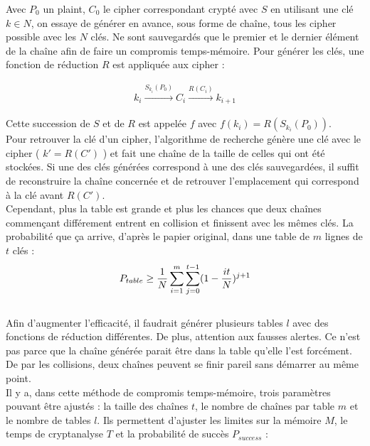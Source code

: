 
	Avec $P_0$ un \gls{plaint}, $C_0$ le \gls{cipher} correspondant crypté avec $S$ en utilisant une clé $k \in N$, on essaye de générer en avance, sous forme de chaîne, tous les \gls{cipher} possible avec les $N$ clés. Ne sont sauvegardés que le premier et le dernier élément de la chaîne afin de faire un compromis temps-mémoire. Pour générer les clés, une fonction de réduction $R$ est appliquée aux \gls{cipher} :

	\begin{align*}
		k_i \overset{S_{k_i}(P_0)}{\longrightarrow} C_i \overset{R(C_i)}{\longrightarrow} k_{i+1}
	\end{align*}

	Cette succession de $S$ et de $R$ est appelée $f$ avec $f(k_i) = R(S_{k_i}(P_0))$.\\

	Pour retrouver la clé d'un \gls{cipher}, l'algorithme de recherche génère une clé avec le \gls{cipher} ( $k' = R(C')$ ) et fait une chaîne de la taille de celles qui ont été stockées. Si une des clés générées correspond à une des clés sauvegardées, il suffit de reconstruire la chaîne concernée et de retrouver l'emplacement qui correspond à la clé avant $R(C')$.\\

	Cependant, plus la table est grande et plus les chances que deux chaînes commençant différement entrent en collision et finissent avec les mêmes clés. La probabilité que ça arrive, d'après le papier original\cite{ehellman}, dans une table de $m$ lignes de $t$ clés :\\

	\begin{align*}
		P_{table} \ge{} \frac{1}{N} \sum\limits_{i=1}^{m}\sum\limits_{j=0}^{t-1} (1 - \frac{it}{N})^{j+1}
	\end{align*}\\

	Afin d'augmenter l'efficacité, il faudrait générer plusieurs tables $l$ avec des fonctions de réduction différentes. De plus, attention aux fausses alertes. Ce n'est pas parce que la chaîne générée parait être dans la table qu'elle l'est forcément. De par les collisions, deux chaînes peuvent se finir pareil sans démarrer au même point.\\

	Il y a, dans cette méthode de compromis temps-mémoire, trois paramètres pouvant être ajustés : la taille des chaînes $t$, le nombre de chaînes par table $m$ et le nombre de tables $l$. Ils permettent d'ajuster les limites sur la mémoire $M$, le temps de cryptanalyse $T$ et la probabilité de succès $P_{success}$\cite{Oech03} :\\

